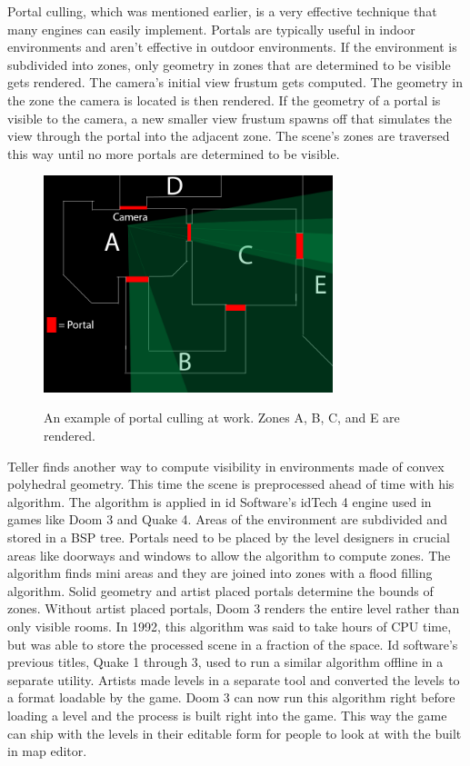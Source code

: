 \documentclass[12pt]{ucthesis}
\newcommand{\captionfonts}{\small\bf\ssp}
\begin{document}
Portal culling, which was mentioned earlier, is a very effective technique that many engines can easily implement.
Portals are typically useful in indoor environments and aren't effective in outdoor environments.\cite{Portals-mirrors}
If the environment is subdivided into zones, only geometry in zones that are determined to be visible gets rendered.
The camera's initial view frustum gets computed.
The geometry in the zone the camera is located is then rendered.
If the geometry of a portal is visible to the camera, a new smaller view frustum spawns off that simulates the view through the portal into the adjacent zone.
The scene's zones are traversed this way until no more portals are determined to be visible.

\begin{figure}
\begin{center}
\includegraphics[width=0.75\textwidth]{Images/Portal-Culling.png}
\captionfonts
\caption[Portal Culling]{An example of portal culling at work.  Zones A, B, C, and E are rendered.}
\label{fig:portal-culling}
\end{center}
\end{figure}

Teller finds another way to compute visibility in environments made of convex polyhedral geometry.\cite{Vis-Computations-Densely-Occluded}
This time the scene is preprocessed ahead of time with his algorithm.
The algorithm is applied in id Software's idTech 4 engine used in games like Doom 3 and Quake 4.\cite{Doom3-source-review}
Areas of the environment are subdivided and stored in a BSP tree.
Portals need to be placed by the level designers in crucial areas like doorways and windows to allow the algorithm to compute zones.
The algorithm finds mini areas and they are joined into zones with a flood filling algorithm.
Solid geometry and artist placed portals determine the bounds of zones.
Without artist placed portals, Doom 3 renders the entire level rather than only visible rooms.
In 1992, this algorithm was said to take hours of CPU time, but was able to store the processed scene in a fraction of the space.
Id software's previous titles, Quake 1 through 3, used to run a similar algorithm offline in a separate utility.
Artists made levels in a separate tool and converted the levels to a format loadable by the game.
Doom 3 can now run this algorithm right before loading a level and the process is built right into the game.
This way the game can ship with the levels in their editable form for people to look at with the built in map editor.
\end{document}

